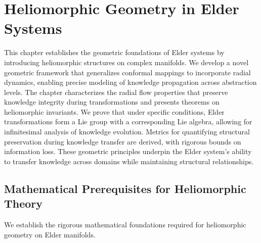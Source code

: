 \chapter{Heliomorphic Geometry in Elder Systems}

\begin{tcolorbox}[colback=DarkSkyBlue!5!white,colframe=DarkSkyBlue!75!black,title=Chapter Summary]
This chapter establishes the geometric foundations of Elder systems by introducing heliomorphic structures on complex manifolds. We develop a novel geometric framework that generalizes conformal mappings to incorporate radial dynamics, enabling precise modeling of knowledge propagation across abstraction levels. The chapter characterizes the radial flow properties that preserve knowledge integrity during transformations and presents theorems on heliomorphic invariants. We prove that under specific conditions, Elder transformations form a Lie group with a corresponding Lie algebra, allowing for infinitesimal analysis of knowledge evolution. Metrics for quantifying structural preservation during knowledge transfer are derived, with rigorous bounds on information loss. These geometric principles underpin the Elder system's ability to transfer knowledge across domains while maintaining structural relationships.
\end{tcolorbox}

\section{Mathematical Prerequisites for Heliomorphic Theory}

We establish the rigorous mathematical foundations required for heliomorphic geometry on Elder manifolds.

